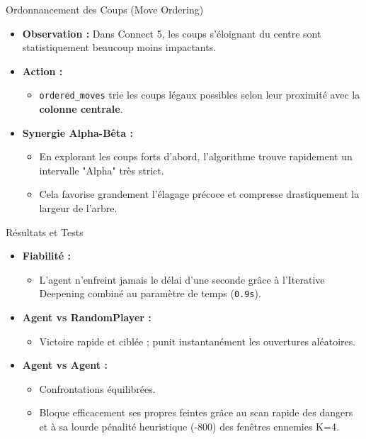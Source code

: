 \documentclass{beamer}
\begin{document}
\begin{frame}{Ordonnancement des Coups (Move Ordering)}
    \begin{itemize}
        \item \textbf{Observation :} Dans Connect 5, les coups s'éloignant du centre sont statistiquement beaucoup moins impactants.
        \vspace{0.3cm}
        \item \textbf{Action :} 
        \begin{itemize}
            \item \texttt{ordered\_moves} trie les coups légaux possibles selon leur proximité avec la \textbf{colonne centrale}.
        \end{itemize}
        \vspace{0.3cm}
        \item \textbf{Synergie Alpha-Bêta :}
        \begin{itemize}
            \item En explorant les coups forts d'abord, l'algorithme trouve rapidement un intervalle "Alpha" très strict.
            \item Cela favorise grandement l'élagage précoce et compresse drastiquement la largeur de l'arbre.
        \end{itemize}
    \end{itemize}
\end{frame}

\begin{frame}{Résultats et Tests}
    \begin{itemize}
        \item \textbf{Fiabilité :}
        \begin{itemize}
            \item L'agent n'enfreint jamais le délai d'une seconde grâce à l'Iterative Deepening combiné au paramètre de temps (\texttt{0.9s}).
        \end{itemize}
        \vspace{0.3cm}
        \item \textbf{Agent vs RandomPlayer :}
        \begin{itemize}
            \item Victoire rapide et ciblée ; punit instantanément les ouvertures aléatoires.
        \end{itemize}
        \vspace{0.3cm}
        \item \textbf{Agent vs Agent :}
        \begin{itemize}
            \item Confrontations équilibrées.
            \item Bloque efficacement ses propres feintes grâce au scan rapide des dangers et à sa lourde pénalité heuristique (-800) des fenêtres ennemies K=4.
        \end{itemize}
    \end{itemize}
\end{frame}
\end{document}
